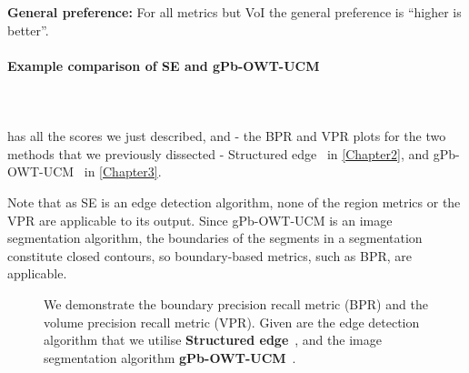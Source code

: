 \textbf{General preference:} For all metrics but VoI the general preference is ``higher is better''.

\paragraph{Example comparison of SE and gPb-OWT-UCM}\mbox{}\\\mbox{}\\
 has all the scores we just described, and  - the BPR and VPR plots for the two methods that we previously dissected - Structured edge~\cite{DollarICCV13edges} in \cref{Chapter2}, and gPb-OWT-UCM~\cite{Arbelaez11} in \cref{Chapter3}. 

Note that as SE is an edge detection algorithm, none of the region metrics or the VPR are applicable to its output. Since gPb-OWT-UCM is an image segmentation algorithm, the boundaries of the segments in a segmentation constitute closed contours, so boundary-based metrics, such as BPR, are applicable.

\begin{figure}[ht!]
\centering
\caption[SE and gPb-OWT-UCM plots]{We demonstrate the boundary precision recall metric (BPR) and the volume precision recall metric (VPR). Given are the edge detection algorithm that we utilise {\bf Structured edge}~\cite{DollarICCV13edges}, and the image segmentation algorithm {\bf gPb-OWT-UCM}~\cite{Arbelaez11}.}
\label{fig:SE_vs_gPb_OWT_UCM}
\end{figure}

